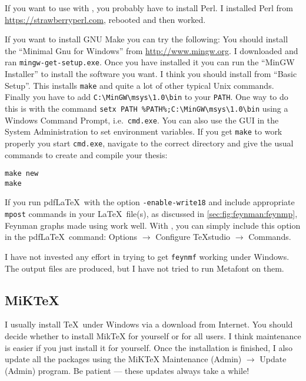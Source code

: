 If you want to use  with \TeXstudio,
you probably have to install Perl.
I installed Perl from \url{https://strawberryperl.com},
rebooted and  then worked.

If you want to install GNU Make you can try the following:
You should install the \enquote{Minimal Gnu for Windows} from \url{http://www.mingw.org}.
I downloaded and ran \texttt{mingw-get-setup.exe}.
Once you have installed it you can run the \enquote{MinGW Installer} to install the software you want.
I think you should install  from \enquote{Basic Setup}.
This installs \texttt{make} and quite a lot of other typical Unix commands.
Finally you have to add \verb|C:\MinGW\msys\1.0\bin| to your \texttt{PATH}.
One way to do this is with the command \verb|setx PATH %PATH%;C:\MinGW\msys\1.0\bin| using a Windows Command Prompt, 
i.e.\ \texttt{cmd.exe}.
You can also use the GUI in the System Administration to set environment variables.
If you get \texttt{make} to work properly you start \texttt{cmd.exe},
navigate to the correct directory and give the usual commands to create and compile your thesis:
\begin{verbatim}
make new
make
\end{verbatim}

If you run pdf\LaTeX\ with the option \texttt{-enable-write18} and
include appropriate \texttt{mpost} commands in your \LaTeX\ file(s), %
as discussed in \cref{sec:fig:feynman:feynmp}, Feynman graphs made
using  work well.
With \TeXstudio, you can simply
include this option in the pdf\LaTeX\ command: \textsf{Options} $\to$
\textsf{Configure TeXstudio} $\to$ \textsf{Commands}.

I have not invested any effort in trying to get \texttt{feynmf}
working under Windows. The output files are produced, but I have not
tried to run Metafont on them.


\subsection{MiK\TeX}%
\label{sec:app:miktex}

I usually install \TeX\ under Windows via a download from Internet.
You should decide whether to install Mik\TeX{} for yourself or for all users.
I think maintenance is easier if you just install it for yourself.
Once the installation is finished, I also update all the
packages using the MiK\TeX{} Maintenance (Admin) $\to$ Update (Admin) program.
Be patient --- these updates always take a while!

